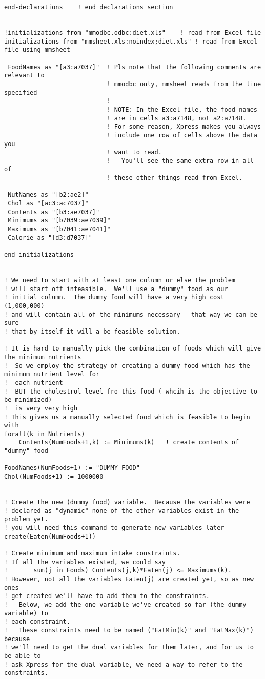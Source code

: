 \documentclass[twoside,12pt]{article}
\begin{document}
\begin{verbatim}
end-declarations	! end declarations section


!initializations from "mmodbc.odbc:diet.xls"	! read from Excel file
initializations from "mmsheet.xls:noindex;diet.xls"	! read from Excel file using mmsheet

 FoodNames as "[a3:a7037]"	! Pls note that the following comments are relevant to 
 							! mmodbc only, mmsheet reads from the line specified
 							!
 							! NOTE: In the Excel file, the food names
 							! are in cells a3:a7148, not a2:a7148.
 							! For some reason, Xpress makes you always
							! include one row of cells above the data you
							! want to read.  
							!	You'll see the same extra row in all of 
							! these other things read from Excel.
							
 NutNames as "[b2:ae2]"	 						
 Chol as "[ac3:ac7037]"
 Contents as "[b3:ae7037]" 
 Minimums as "[b7039:ae7039]"
 Maximums as "[b7041:ae7041]"
 Calorie as "[d3:d7037]"
 
end-initializations


! We need to start with at least one column or else the problem 
! will start off infeasible.  We'll use a "dummy" food as our 
! initial column.  The dummy food will have a very high cost (1,000,000)
! and will contain all of the minimums necessary - that way we can be sure
! that by itself it will a be feasible solution.

! It is hard to manually pick the combination of foods which will give the minimum nutrients
!  So we employ the strategy of creating a dummy food which has the minimum nutrient level for
!  each nutrient
!  BUT the cholestrol level fro this food ( whcih is the objective to be minimized) 
!  is very very high
! This gives us a manually selected food which is feasible to begin with
forall(k in Nutrients)
	Contents(NumFoods+1,k) := Minimums(k)	! create contents of "dummy" food
	
FoodNames(NumFoods+1) := "DUMMY FOOD"
Chol(NumFoods+1) := 1000000


! Create the new (dummy food) variable.  Because the variables were 
! declared as "dynamic" none of the other variables exist in the problem yet.
! you will need this command to generate new variables later
create(Eaten(NumFoods+1))	

! Create minimum and maximum intake constraints.
! If all the variables existed, we could say
!       sum(j in Foods) Contents(j,k)*Eaten(j) <= Maximums(k).
! However, not all the variables Eaten(j) are created yet, so as new ones
! get created we'll have to add them to the constraints.
!   Below, we add the one variable we've created so far (the dummy variable) to
! each constraint.
!   These constraints need to be named ("EatMin(k)" and "EatMax(k)") because
! we'll need to get the dual variables for them later, and for us to be able to 
! ask Xpress for the dual variable, we need a way to refer to the constraints.


\end{verbatim}
\end{document}

